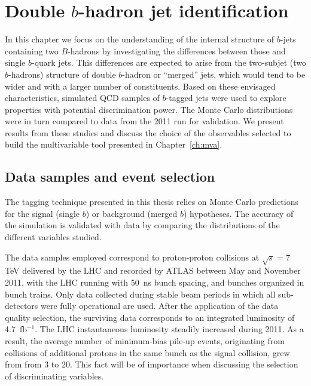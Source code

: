 
\chapter{Double $b$-hadron jet identification}\label{ch:kinematic}

In this chapter we focus on the understanding of the internal structure of $b$-jets containing two $B$-hadrons by investigating the differences between those and single $b$-quark jets.  This differences %
are expected to arise from the two-subjet (two $b$-hadrons) structure of double $b$-hadron or ``merged'' jets, which would tend to be wider and with a larger number of constituents. 
Based on these envisaged characteristics, simulated QCD samples of $b$-tagged jets were used to explore properties with potential discrimination power.  The Monte Carlo distributions were in turn compared to data from the 2011 run for validation.
We present results from these studies and discuss the choice of the observables selected to build the multivariable tool presented in Chapter~\ref{ch:mva}.


\section{Data samples and event selection}\label{sec:analysis}


The tagging technique presented in this thesis relies on Monte Carlo predictions for the signal (single $b$) or background (merged $b$) hypotheses. The accuracy of the simulation is validated with data by comparing the distributions of the different variables studied.

The data samples employed correspond to proton-proton collisions at $\sqrt{s}=7$ TeV delivered by the LHC and recorded by ATLAS between May and November 2011, with the LHC running with 50~ns bunch spacing, and bunches organized in bunch trains. Only data collected during stable beam periods in which all sub-detectors were fully operational are used. After the application of the data quality selection, the  surviving data corresponds to an integrated luminosity of 4.7~fb$^{-1}$. The LHC instantaneous luminosity steadily increased during 2011. As a result, the average number of minimum-bias pile-up events, originating from collisions of additional protons in the same bunch as the signal collision, grew from from 3 to 20. This fact will be of importance when discussing the selection of discriminating variables.  

